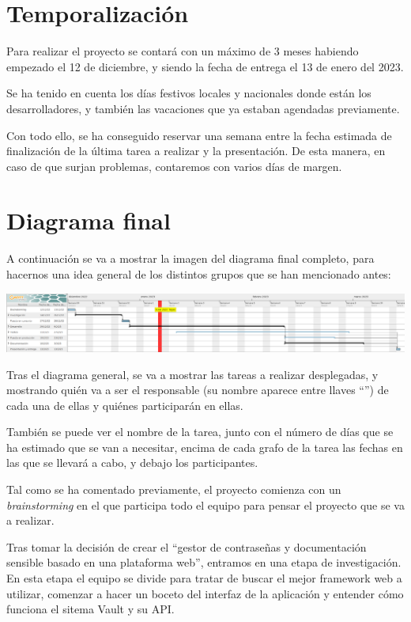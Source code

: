 \documentclass{\ClassPath/viu-tfm-template}
\begin{document}
\section{Temporalización}
Para realizar el proyecto se contará con un máximo de 3 meses habiendo empezado el 12 de diciembre, y siendo la fecha de entrega el 13 de enero del 2023.

Se ha tenido en cuenta los días festivos locales y nacionales donde están los desarrolladores, y también las vacaciones que ya estaban agendadas previamente.

Con todo ello, se ha conseguido reservar una semana entre la fecha estimada de finalización de la última tarea a realizar y la presentación. De esta manera, en caso de que surjan problemas, contaremos con varios días de margen.

\section{Diagrama final}

A continuación se va a mostrar la imagen del diagrama final completo, para hacernos una idea general de los distintos grupos que se han mencionado antes:

\begin{center}
    \includegraphics[frame,width=\linewidth]{img/diagrama.png}
\end{center}


Tras el diagrama general, se va a mostrar las tareas a realizar desplegadas, y mostrando quién va a ser el responsable (su nombre aparece entre llaves “{}”) de cada una de ellas y quiénes participarán en ellas.

También se puede ver el nombre de la tarea, junto con el número de días que se ha estimado que se van a necesitar, encima de cada grafo de la tarea las fechas en las que se llevará a cabo, y debajo los participantes.

Tal como se ha comentado previamente, el proyecto comienza con un \textit{brainstorming} en el que participa todo el equipo para pensar el proyecto que se va a realizar.

Tras tomar la decisión de crear el “gestor de contraseñas y documentación sensible basado en una plataforma web”, entramos en una etapa de investigación. En esta etapa el equipo se divide para tratar de buscar el mejor framework web a utilizar, comenzar a hacer un boceto del interfaz de la aplicación y entender cómo funciona el sitema Vault y su API.
\end{document}
